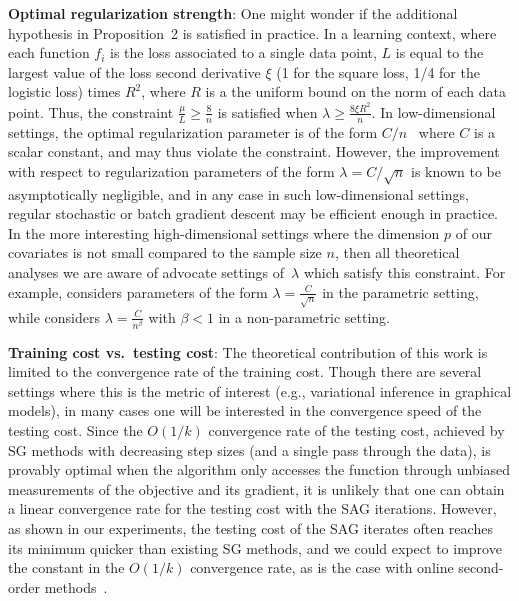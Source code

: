 \documentclass{article}
\begin{document}
\textbf{Optimal regularization strength}: One might wonder if the additional hypothesis in Proposition~2 is satisfied in practice. In
a learning context, where each function $f_i$ is the loss
associated to a single data point, $L$ is equal to the largest
value of the loss second derivative $\xi$ (1 for the square loss, 1/4 for
the logistic loss) times $R^2$, where $R$ is a the uniform bound on the norm of each
data point. Thus, the constraint $\frac{\mu}{L}\geqslant \frac{8}{n}$ is
satisfied when
$\lambda \geqslant \frac{8 \xi R^2}{n}$. In low-dimensional settings, the optimal
regularization parameter is of the form $C/n$~\cite{liang} where
$C$ is a scalar constant, and may
thus violate the constraint. However, the improvement with respect to
regularization parameters of the form $\lambda =C/\sqrt{n}$ is known
to be asymptotically negligible, and in any case in such
low-dimensional settings, regular stochastic or batch
gradient descent may be efficient enough in practice.
In the more interesting high-dimensional settings where the
dimension $p$ of our covariates is not small compared to the sample
size $n$, then all theoretical analyses we are aware of advocate
settings of~$\lambda$ which satisfy this constraint.  For example,
\cite{srebro} considers parameters of the form $\lambda =
\frac{C}{\sqrt{n}}$ in the parametric setting, while \cite{steinwart}
considers  $\lambda = \frac{C}{n^{\beta}}$ with $\beta <1$ in a
non-parametric setting.

\textbf{Training cost vs.~testing cost}: The theoretical contribution of this work is limited to the convergence rate of the training cost. Though there are several settings where this is the metric of interest (e.g., variational inference in graphical models), in many cases one will be interested in the convergence speed of the testing cost. Since the $O(1/k)$ convergence rate of the testing cost, achieved by SG methods with decreasing step sizes (and a single pass through the data), is provably optimal when the algorithm only accesses the function through unbiased measurements of the objective and its gradient, it is unlikely that one can obtain a linear convergence rate for the testing cost with the SAG iterations. However, as shown in our experiments, the testing cost of the SAG iterates often reaches its minimum quicker than existing SG methods, and we could expect to improve the constant in the $O(1/k)$ convergence rate, as is the case with online second-order methods~\cite{bottou-bousquet-2011}.
\end{document}
